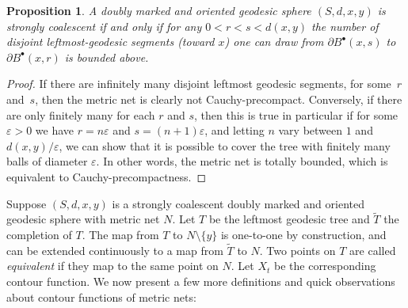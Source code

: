 \documentclass[JEP,XML,SOM,Unicode]{cedram}
\newcommand{\sbullet}{{\scriptscriptstyle\bullet}}
\let\epsilon\varepsilon
\theoremstyle{plain}
\numberwithin{theorem}{section}
\newtheorem{proposition}[theorem]{Proposition}
\theoremstyle{definition}
\let\wt\widetilde
\newcommand{\fb}[2]{B^\sbullet(#1,#2)}
\begin{document}
\begin{proposition}
\label{prop::coalescentprecompact}
A doubly marked and oriented geodesic sphere $(S,d,x,y)$ is strongly coalescent if and only if for any $0<r<s <d(x,y)$ the number of disjoint leftmost-geodesic segments (toward $x$) one can draw from $\partial \fb{x}{s}$ to $\partial \fb{x}{r}$ is bounded above.
\end{proposition}
\begin{proof}
If there are infinitely many disjoint leftmost geodesic segments, for some~$r$ and~$s$, then the metric net is clearly not Cauchy-precompact. Conversely, if there are only finitely many for each $r$ and $s$, then this is true in particular if for some $\epsilon>0$ we have $r = n \epsilon$ and $s=(n+1)\epsilon$, and letting $n$ vary between $1$ and $d(x,y)/\epsilon$, we can show that it is possible to cover the tree with finitely many balls of diameter $\epsilon$. In other words, the metric net is totally bounded, which is equivalent to Cauchy-precompactness.
\end{proof}

Suppose $(S,d,x,y)$ is a strongly coalescent doubly marked and oriented geodesic sphere with metric net $N$. Let $T$ be the leftmost geodesic tree and $\wt T$ the completion of $T$. The map from $T$ to $N \setminus \{y\}$ is one-to-one by construction, and can be extended continuously to a map from $\wt T$ to $N$. Two points on $T$ are called \emph{equivalent} if they map to the same point on $N$. Let $X_t$ be the corresponding contour function. We now present a few more definitions and quick observations about contour functions of metric nets:
\end{document}
